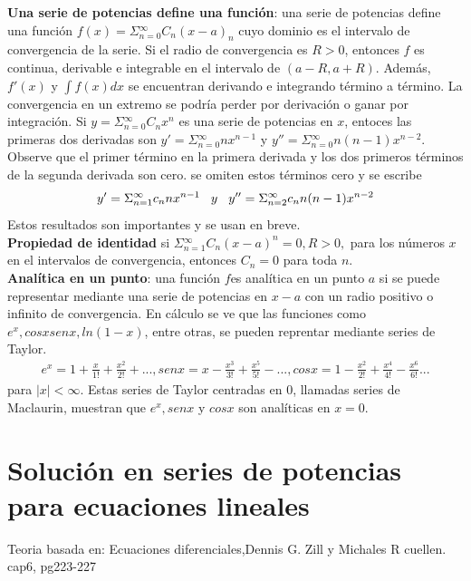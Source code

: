 \documentclass[12pt,letterpaper,oneside]{article}
\begin{document}
  \textbf{Una serie de potencias define una función}: una serie de potencias define una función $f(x)= \Sigma{^\infty_{n=0}} C_n (x - a)_n$ cuyo dominio es el intervalo de convergencia de la serie. Si el radio de convergencia es $R>0$, entonces $f$ es continua, derivable e integrable en el intervalo de $(a - R, a + R)$. Además, $f'(x)$ y $\int f(x)dx$ se encuentran derivando e integrando término a término. La convergencia en un extremo se podría perder por derivación o ganar por integración. Si $y= \Sigma{^\infty_{n=0}} C_n x^n$ es una serie de potencias en $x$, entoces las primeras dos derivadas son $y'=   \Sigma{^\infty_{n=0}} nx ^ { n - 1 }$ y $y''=  \Sigma{^\infty_{n=0}} n ( n - 1 )x^{n-2}$. Observe que el primer término en la primera derivada y los dos primeros términos de la segunda derivada son cero. se omiten estos términos cero y se escribe\\
  \begin{align*}
  y'= \Sigma{^\infty_{n=1}} c_n nx^{n-1} \hspace{0.3cm}  y  \hspace{0.3cm}  y''= \Sigma{^\infty_{n=2}} c_nn(n-1)x^{n-2}
  \end{align*}
 Estos resultados son importantes y se usan en breve.\vspace{0.3cm}\\
 \textbf{Propiedad de identidad} si $\Sigma{^\infty_{n=1}} C_n(x-a)^n = 0, R>0,$ para los números $x$ en el intervalos de convergencia, entonces $C_n = 0$ para toda $n$.\vspace{0.3cm}\\
 \textbf{Analítica en un punto}: una función $f$es analítica en un punto $a$ si se puede representar mediante una serie de potencias en $x - a$ con un radio positivo o infinito de convergencia. En cálculo se ve que las funciones como $e^x, cos x sen x, ln(1 - x)$, entre otras, se pueden reprentar mediante series de Taylor.\\
 \begin{align*}
 e^x = 1 + \frac{x}{1!} + \frac{x^2}{2!} +..., sen x = x- \frac{x^3}{3!} + \frac{x^5}{5!} -..., cos x = 1 - \frac{x^2}{2!} + \frac{x^4}{4!} - \frac{x^6}{6!}...
 \end{align*}
 para $|x|<\infty.$ Estas series de Taylor centradas en 0, llamadas series de Maclaurin, muestran que $e^x, sen x$ y $cos x$ son analíticas en $x = 0$.\vspace{0.3cm}\\
\section{Solución en series de potencias para ecuaciones lineales}
Teoria basada en: Ecuaciones diferenciales,Dennis G. Zill y Michales R cuellen. cap6, pg223-227
\end{document}
